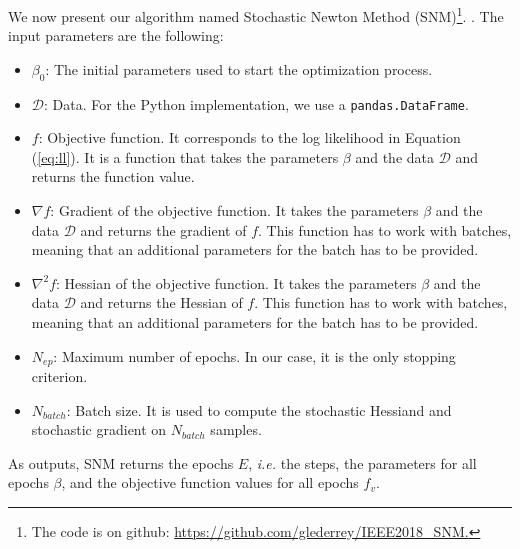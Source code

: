 \documentclass[conference]{IEEEtran}
\begin{document}
We now present our algorithm named Stochastic Newton Method (SNM)\footnote{The code is on github: \href{https://github.com/glederrey/IEEE2018\_SNM}{https://github.com/glederrey/IEEE2018\_SNM.}}.
. The input parameters are the following:
\begin{itemize}
\item $\beta_0$: The initial parameters used to start the optimization process.
\item $\mathcal{D}$: Data. For the Python implementation, we use a \texttt{pandas.DataFrame}.
\item $f$: Objective function. It corresponds to the log likelihood in Equation (\ref{eq:ll}). It is a function that takes the parameters $\beta$ and the data $\mathcal{D}$ and returns the function value.
\item $\nabla f$: Gradient of the objective function. It takes the parameters $\beta$ and the data $\mathcal{D}$ and returns the gradient of $f$. This function has to work with batches, meaning that an additional parameters for the batch has to be provided.
\item $\nabla^2 f$: Hessian of the objective function. It takes the parameters $\beta$ and the data $\mathcal{D}$ and returns the Hessian of $f$. This function has to work with batches, meaning that an additional parameters for the batch has to be provided.
\item $N_{ep}$: Maximum number of epochs. In our case, it is the only stopping criterion.
\item $N_{batch}$: Batch size. It is used to compute the stochastic Hessiand and stochastic gradient on $N_{batch}$ samples.
\end{itemize}
As outputs, SNM returns the epochs $E$, {\it i.e.} the steps, the parameters for all epochs $\beta$, and the objective function values for all epochs $f_v$. 
\end{document}
